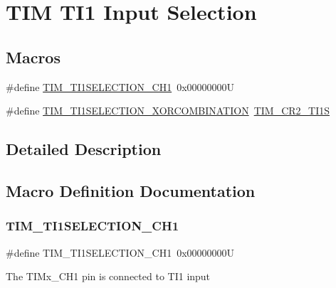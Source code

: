 \hypertarget{group___t_i_m___t_i1___selection}{}\section{T\+IM T\+I1 Input Selection}
\label{group___t_i_m___t_i1___selection}
\subsection*{Macros}
\begin{DoxyCompactItemize}
\item 
\#define \mbox{\hyperlink{group___t_i_m___t_i1___selection_gace6563bccf7635461f660fbed6241488}{T\+I\+M\+\_\+\+T\+I1\+S\+E\+L\+E\+C\+T\+I\+O\+N\+\_\+\+C\+H1}}~0x00000000U
\item 
\#define \mbox{\hyperlink{group___t_i_m___t_i1___selection_ga40dfcb0e3f2fdf0f45cbba227106310a}{T\+I\+M\+\_\+\+T\+I1\+S\+E\+L\+E\+C\+T\+I\+O\+N\+\_\+\+X\+O\+R\+C\+O\+M\+B\+I\+N\+A\+T\+I\+ON}}~\mbox{\hyperlink{group___peripheral___registers___bits___definition_gad07504497b70af628fa1aee8fe7ef63c}{T\+I\+M\+\_\+\+C\+R2\+\_\+\+T\+I1S}}
\end{DoxyCompactItemize}


\subsection{Detailed Description}


\subsection{Macro Definition Documentation}
\mbox{\label{group___t_i_m___t_i1___selection_gace6563bccf7635461f660fbed6241488}} 
\subsubsection{\texorpdfstring{TIM\_TI1SELECTION\_CH1}{TIM\_TI1SELECTION\_CH1}}
{\footnotesize\ttfamily \#define T\+I\+M\+\_\+\+T\+I1\+S\+E\+L\+E\+C\+T\+I\+O\+N\+\_\+\+C\+H1~0x00000000U}

The T\+I\+Mx\+\_\+\+C\+H1 pin is connected to T\+I1 input \mbox{\label{group___t_i_m___t_i1___selection_ga40dfcb0e3f2fdf0f45cbba227106310a}} 
